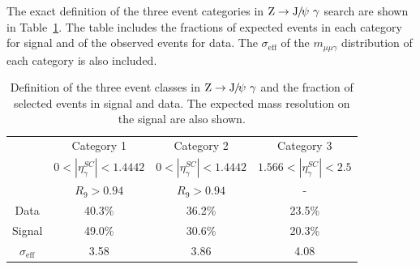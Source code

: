 		The exact definition of the three event categories in $\mathrm{Z}\to{\mathrm{J}\hspace{-.08em}/\hspace{-.14em}\psi}\ \gamma$ search are shown in Table~\ref{tab:2}.
		The table includes the fractions of expected events in each category for signal and of the observed events for data. The $\sigma_{\text{eff}}$ of the $m_{\mu\mu\gamma}$ distribution of each category is also included. 
		
		\begin{table}[!ht]
		\small
		\begin{center}
		\begin{tabular}{cccc}
		\hline
		           & Category 1  & Category 2 & Category 3\\
		           \cline{2-4}
		           & $0<|\eta_{\gamma}^{SC}|<1.4442$ & $0<|\eta_{\gamma}^{SC}|<1.4442$ & $1.566<|\eta_{\gamma}^{SC}|<2.5$ \\
		           & $R_{9} > 0.94$ & $R_{9} > 0.94$ & - \\
		           \hline
		Data & 40.3\% & 36.2\% & 23.5\% \\
		Signal & 49.0\% & 30.6\% & 20.3\% \\
		$\sigma_{\text{eff}}$&  3.58\GeV & 3.86\GeV & 4.08\GeV\\                                                                      
		\hline
		    \end{tabular}
		    \caption{Definition of the three event classes in $\mathrm{Z}\to{\mathrm{J}\hspace{-.08em}/\hspace{-.14em}\psi}\ \gamma$ and the fraction of selected events in signal and data. The expected mass resolution on the signal are also shown.\label{tab:2}}
		  \end{center}
		\end{table}
		
